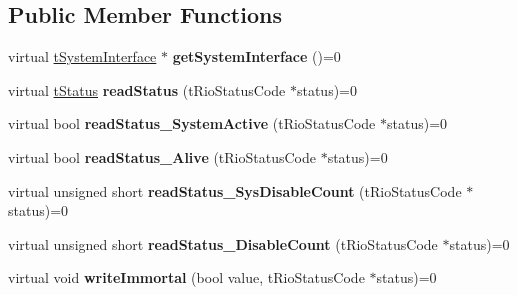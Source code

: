 \subsection*{Public Member Functions}
\begin{DoxyCompactItemize}
\item 
\hypertarget{classnFPGA_1_1nFRC__2012__1__6__4_1_1tWatchdog_a0fe37330503ecba480e19fe7e78fe72e}{
virtual \hyperlink{classnFPGA_1_1tSystemInterface}{tSystemInterface} $\ast$ {\bfseries getSystemInterface} ()=0}
\label{classnFPGA_1_1nFRC__2012__1__6__4_1_1tWatchdog_a0fe37330503ecba480e19fe7e78fe72e}

\item 
\hypertarget{classnFPGA_1_1nFRC__2012__1__6__4_1_1tWatchdog_aba2ad1b443fc70c030e6d2fa2d89327f}{
virtual \hyperlink{unionnFPGA_1_1nFRC__2012__1__6__4_1_1tWatchdog_1_1tStatus}{tStatus} {\bfseries readStatus} (tRioStatusCode $\ast$status)=0}
\label{classnFPGA_1_1nFRC__2012__1__6__4_1_1tWatchdog_aba2ad1b443fc70c030e6d2fa2d89327f}

\item 
\hypertarget{classnFPGA_1_1nFRC__2012__1__6__4_1_1tWatchdog_a6fe9bd98661a73fc8b67f10fae9da962}{
virtual bool {\bfseries readStatus\_\-SystemActive} (tRioStatusCode $\ast$status)=0}
\label{classnFPGA_1_1nFRC__2012__1__6__4_1_1tWatchdog_a6fe9bd98661a73fc8b67f10fae9da962}

\item 
\hypertarget{classnFPGA_1_1nFRC__2012__1__6__4_1_1tWatchdog_a6914fa58f1dd8206c21426c8f64acb54}{
virtual bool {\bfseries readStatus\_\-Alive} (tRioStatusCode $\ast$status)=0}
\label{classnFPGA_1_1nFRC__2012__1__6__4_1_1tWatchdog_a6914fa58f1dd8206c21426c8f64acb54}

\item 
\hypertarget{classnFPGA_1_1nFRC__2012__1__6__4_1_1tWatchdog_a570ac2db7095b0a7822b4d56efb71b1f}{
virtual unsigned short {\bfseries readStatus\_\-SysDisableCount} (tRioStatusCode $\ast$status)=0}
\label{classnFPGA_1_1nFRC__2012__1__6__4_1_1tWatchdog_a570ac2db7095b0a7822b4d56efb71b1f}

\item 
\hypertarget{classnFPGA_1_1nFRC__2012__1__6__4_1_1tWatchdog_ad100b0a247a57933a94b51fc0ff058ca}{
virtual unsigned short {\bfseries readStatus\_\-DisableCount} (tRioStatusCode $\ast$status)=0}
\label{classnFPGA_1_1nFRC__2012__1__6__4_1_1tWatchdog_ad100b0a247a57933a94b51fc0ff058ca}

\item 
\hypertarget{classnFPGA_1_1nFRC__2012__1__6__4_1_1tWatchdog_ad15b1a8c3425a58c1a013dc62d05b31c}{
virtual void {\bfseries writeImmortal} (bool value, tRioStatusCode $\ast$status)=0}
\label{classnFPGA_1_1nFRC__2012__1__6__4_1_1tWatchdog_ad15b1a8c3425a58c1a013dc62d05b31c}


\end{DoxyCompactItemize}
